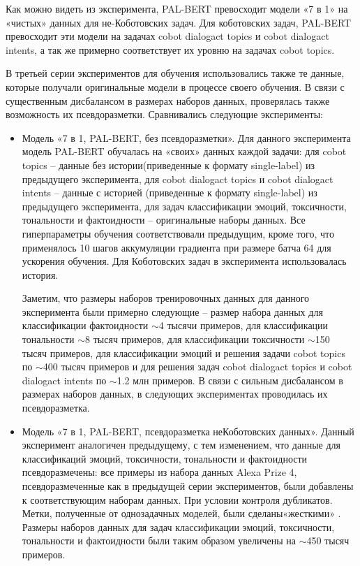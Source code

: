 Как можно видеть из эксперимента, PAL-BERT превосходит модели «7 в 1» на «чистых» данных для не-Коботовских задач. Для коботовских задач, PAL-BERT превосходит эти модели на задачах cobot dialogact topics и cobot dialogact intents, а так же примерно соответствует их уровню на задачах cobot topics.

В третьей серии экспериментов для обучения использовались также те данные, которые получали оригинальные модели в процессе своего обучения. В связи с существенным дисбалансом в размерах наборов данных, проверялась также возможность их псевдоразметки. Сравнивались следующие эксперименты:
\begin{itemize}
\item Модель «7 в 1, PAL-BERT, без псевдоразметки». Для данного эксперимента модель PAL-BERT обучалась на «своих» данных каждой задачи: для cobot topics -- данные без истории(приведенные к формату single-label) из предыдущего эксперимента, для cobot dialogact topics и cobot dialogact intents -- данные с историей (приведенные к формату single-label) из предыдущего эксперимента, для задач классификации эмоций, токсичности, тональности и фактоидности -- оригинальные наборы данных. Все гиперпараметры обучения соответствовали предыдущим, кроме того, что применялось 10 шагов аккумуляции градиента при размере батча 64 для ускорения обучения. Для Коботовских задач в эксперимента использовалась история.

Заметим, что размеры наборов тренировочных данных для данного эксперимента были примерно следующие -- размер набора данных для классификации фактоидности $\sim$4 тысячи примеров, для классификации тональности $\sim$8 тысяч примеров, для классификации токсичности $\sim$150 тысяч примеров, для классификации эмоций и решения задачи cobot topics по $\sim$400 тысяч примеров и для решения задач cobot dialogact topics и cobot dialogact intents по $\sim$1.2 млн примеров. В связи с сильным дисбалансом в размерах наборов данных, в следующих экспериментах проводилась их псевдоразметка.

\item Модель «7 в 1, PAL-BERT, псевдоразметка неКоботовских данных». Данный эксперимент аналогичен предыдущему, с тем изменением, что данные для классификаций эмоций, токсичности, тональности и фактоидности псевдоразмечены: все примеры из набора данных Alexa Prize 4, псевдоразмеченные как в предыдущей серии экспериментов, были добавлены к соответствующим наборам данных. При условии контроля дубликатов. Метки, полученные от однозадачных моделей, были сделаны«жесткими» . Размеры наборов данных для задач классификации эмоций, токсичности, тональности и фактоидности были таким образом увеличены на $\sim$450 тысяч примеров.


\end{itemize}
